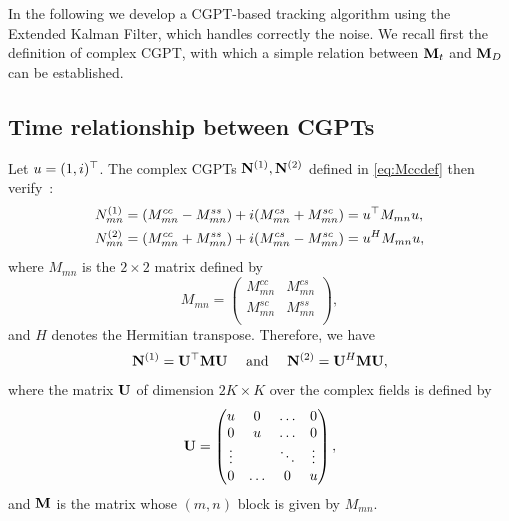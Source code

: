 In the following we develop a CGPT-based tracking algorithm using the Extended Kalman
Filter, which handles correctly the noise. We recall first the definition of complex
CGPT, with which a simple relation between $\mathbf{M}_t$ and $\mathbf{M}_D$ can be established.

\subsection{Time relationship between CGPTs}
Let $u=(1, i)^\top$. The complex CGPTs $\mathbf{N}^{(1)}, \mathbf{N}^{(2)}$ defined in
\eqref{eq:Mccdef} then verify~:
\begin{align*}
  N_{mn}^{(1)} &= (M_{mn}^{cc} - M_{mn}^{ss}) + i (M_{mn}^{cs} + M_{mn}^{sc}) = u^\top M_{mn} u, \\
  N_{mn}^{(2)} &= (M_{mn}^{cc} + M_{mn}^{ss}) + i (M_{mn}^{cs} - M_{mn}^{sc}) = u^H M_{mn}
  u,
\end{align*}
where $M_{mn}$ is the $2\times 2$ matrix defined by
$$
M_{mn} = \begin{pmatrix}
    M_{mn}^{cc} & M_{mn}^{cs} \\
    M_{mn}^{sc} & M_{mn}^{ss} \\
  \end{pmatrix},
$$
and $H$ denotes the Hermitian transpose. Therefore, we have
\begin{align}
  \label{eq:CCGPT_CGPT_mat}
  \mathbf{N}^{(1)} = \mathbf{U}^\top \mathbf{M} \mathbf{U}  \quad \mbox{ and } \quad \mathbf{N}^{(2)} = \mathbf{U}^H \mathbf{M} \mathbf{U},
\end{align}
where the matrix $\mathbf{U}$ of dimension $2K\times K$ over the complex
fields is defined by
\begin{align}
  \label{eq:def_U_mat}
  \mathbf{U} =\begin{pmatrix}
    u & 0 & \ldots & 0\\
    0 & u & \ldots & 0\\
    \vdots & ~ & \ddots & \vdots \\
    0 & \ldots & 0 & u
  \end{pmatrix},
\end{align}
and $\mathbf{M}$ is the matrix whose $(m,n)$ block is given by $M_{mn}$.

